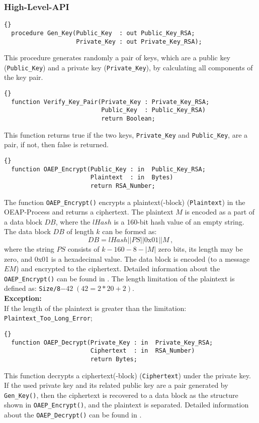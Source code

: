 \subsubsection*{High-Level-API}
\begin{lstlisting}{}
  procedure Gen_Key(Public_Key  : out Public_Key_RSA;
                    Private_Key : out Private_Key_RSA);
\end{lstlisting}
This procedure generates randomly a pair of keys, which are a public
key (\texttt{Public\_Key}) and a private key (\texttt{Private\_Key}),
by calculating all components of the key pair.\\
\begin{lstlisting}{}
  function Verify_Key_Pair(Private_Key : Private_Key_RSA;
                           Public_Key  : Public_Key_RSA)
                           return Boolean;
\end{lstlisting}
This function returns true if the two keys, \texttt{Private\_Key} and
\texttt{Public\_Key}, are a pair, if not, then false is
returned.

\hhline
\begin{lstlisting}{}
  function OAEP_Encrypt(Public_Key : in  Public_Key_RSA;
                        Plaintext  : in  Bytes)
                        return RSA_Number;
\end{lstlisting}
The function \texttt{OAEP\_Encrypt()} encrypts a plaintext(-block)
(\texttt{Plaintext}) in the OEAP-Process and returns a ciphertext.
The plaintext $M$ is encoded as a part of a data block $DB$, where the
$lHash$ is a 160-bit hash value of an empty string. The data block
$DB$ of length $k$ can be formed as:
\begin{equation*}
DB=lHash||PS||0\mbox{x}01||M\,,
\end{equation*}
where the string $PS$ consists of $k-160-8-|M|$ zero bits, its length
may be zero, and 0x01 is a hexadecimal value. The data block is
encoded (to a message $EM$) and encrypted to the ciphertext.  Detailed
information about the \texttt{OAEP\_Encrypt()} can be found in
\cite{PKCS}. The length limitation of the plaintext is defined as:
\texttt{Size/8}$-42\;(42=2*20+2)$.\\

\noindent\textbf{Exception:}\\
If the length of the plaintext is greater than the limitation:\quad
\texttt{Plaintext\_Too\_Long\_Error};

\hhline
\begin{lstlisting}{}
  function OAEP_Decrypt(Private_Key : in  Private_Key_RSA;
                        Ciphertext  : in  RSA_Number)
                        return Bytes;
\end{lstlisting}
This function decrypts a ciphertext(-block) (\texttt{Ciphertext})
under the private key. If the used private key and its related public
key are a pair generated by \texttt{Gen\_Key()}, then the ciphertext
is recovered to a data block as the structure shown in
\texttt{OAEP\_Encrypt()}, and the plaintext is separated. Detailed
information about the \texttt{OAEP\_Decrypt()} can be found in
\cite{PKCS}.\\

